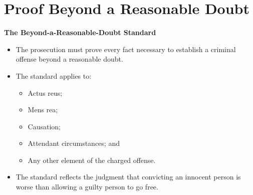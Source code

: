 \documentclass[11pt]{tex/lawoutline}
\begin{document}
\section{Proof Beyond a Reasonable Doubt}

\textbf{The Beyond-a-Reasonable-Doubt Standard}{
\begin{itemize}
    \item The prosecution must prove every fact necessary to establish a criminal offense beyond a reasonable doubt.
    \item The standard applies to:
    \begin{itemize}
        \item Actus reus;
        \item Mens rea;
        \item Causation;
        \item Attendant circumstances; and
        \item Any other element of the charged offense.
    \end{itemize}
    \item The standard reflects the judgment that convicting an innocent person is worse than allowing a guilty person to go free.
\end{itemize}
}
\end{document}
